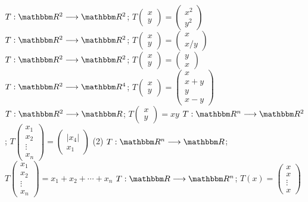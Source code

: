 \begin{tasks}[
    style=enumerate,
    label-offset = 3mm,
    ]
    \task $T: \RR[2] \longrightarrow \RR[2]$; $T\begin{pmatrix*}x \\ y\end{pmatrix*}=\begin{pmatrix*}x^{2} \\ y^{2}\end{pmatrix*}$
    \task $T: \RR[2] \longrightarrow \RR[2]$; $T\begin{pmatrix*}x \\ y\end{pmatrix*}=\begin{pmatrix*}x \\ x/y\end{pmatrix*}$
    \task $T: \RR[2] \longrightarrow \RR[2]$; $T\begin{pmatrix*}x \\ y\end{pmatrix*}=\begin{pmatrix*}y \\ x\end{pmatrix*}$
    \task $T: \RR[2] \longrightarrow \RR[4]$; $T\begin{pmatrix*}x \\ y\end{pmatrix*}=\begin{pmatrix*}x \\ x+y \\ y \\ x-y\end{pmatrix*}$
    \task $T: \RR[2] \longrightarrow \RR$; $T\begin{pmatrix*}x \\ y\end{pmatrix*}=x y$
    \task \!$T: \RR[n] \longrightarrow \RR[2]$; $T\begin{pmatrix*}x_{1} \\ x_{2} \\ \vdots \\ x_{n}\end{pmatrix*}=\begin{pmatrix*} |x_{4}| \\ x_{1} \end{pmatrix*}$
    \task*(2) $T: \RR[n] \longrightarrow \RR$; $T\begin{pmatrix*}x_{1} \\ x_{2} \\ \vdots \\ x_{n}\end{pmatrix*}=x_{1}+x_{2}+\cdots+x_{n}$
    \task $T: \RR \longrightarrow \RR[n]$; $T(x)=\begin{pmatrix*}x \\ x \\ \vdots \\ x\end{pmatrix*}$

\end{tasks}
